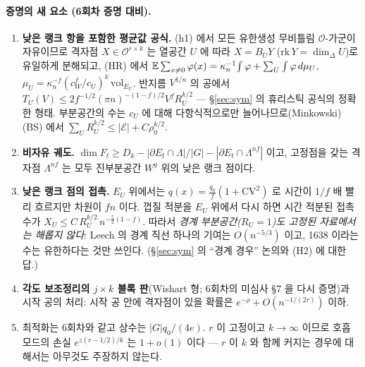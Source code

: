 \paragraph{증명의 새 요소 (6회차 증명 대비).}
\begin{enumerate}
\item \textbf{낮은 랭크 항을 포함한 평균값 공식.} (h1) 에서 모든 유한생성 무비틀림 $\mathcal O$-가군이 자유이므로 격자점 $X\in\mathcal O^{r\times k}$ 는 열공간 $U$ 에 따라 $X=B_UY$ ($\mathrm{rk}\,Y=\dim_\Delta U$)로 유일하게 분해되고, (HR) 에서 $\mathbb{E}\sum_{x\ne0}\varphi(x)=\kappa_n^{-1}\!\int\varphi+\sum_U\int\varphi\,d\mu_U$, $\mu_U=\kappa_n^{-f}(c_W^f/c_U)^k\,\mathrm{vol}_{E_U}$. 반지름 $V^{1/n}$ 의 공에서 $T_U(V)\le2f^{-1/2}(\pi n)^{-(1-f)/2}V^fR_U^{k/2}$ --- \S\ref{sec:sym} 의 휴리스틱 공식의 정확한 형태. 부분공간의 수는 $c_U$ 에 대해 다항식적으로만 늘어나므로(Minkowski) (BS) 에서 $\sum_UR_U^{k/2}\le|\mathcal E|+C\rho_0^{k/2}$.
\item \textbf{비자유 궤도.} $\dim F_t\ge D_k-|\partial E_t\cap\Lambda|/|G|-|\partial E_t\cap\Lambda^{nf}|$ 이고, 고정점을 갖는 격자점 $\Lambda^{nf}$ 는 모두 진부분공간 $W^g$ 위의 낮은 랭크 점이다.
\item \textbf{낮은 랭크 점의 접촉.} $E_U$ 위에서는 $q(x)=\tfrac{q_0}f(1+\mathrm{CV}^2)$ 로 시간이 $1/f$ 배 빨리 흐르지만 차원이 $fn$ 이다. 껍질 적분을 $E_U$ 위에서 다시 하면 시간 적분된 접촉 수가 $X_U\le C\,R_U^{k/2}\,n^{-\frac52(1-f)}$. 따라서 \emph{경계 부분공간($R_U=1$)도 고정된 자료에서는 해롭지 않다}: Leech 의 경계 직선 하나의 기여는 $O(n^{-5/3})$ 이고, 1638 이라는 수는 유한하다는 것만 쓰인다. (\S\ref{sec:sym} 의 ``경계 경우'' 논의와 (H2) 에 대한 답.)
\item \textbf{각도 보조정리의 $j\times k$ 블록 판}(Wishart 형; 6회차의 미심사 \S7 을 다시 증명)과 시작 공의 처리: 시작 공 안에 격자점이 있을 확률은 $e^{-\rho}+O(n^{-1/(2r)})$ 이하.
\item 최적화는 6회차와 같고 상수는 $|G|q_0/(4e)$. $r$ 이 고정이고 $k\to\infty$ 이므로 호흡 모드의 손실 $e^{z(r-1/2)/k}$ 는 $1+o(1)$ 이다 --- $r$ 이 $k$ 와 함께 커지는 경우에 대해서는 아무것도 주장하지 않는다.
\end{enumerate}
